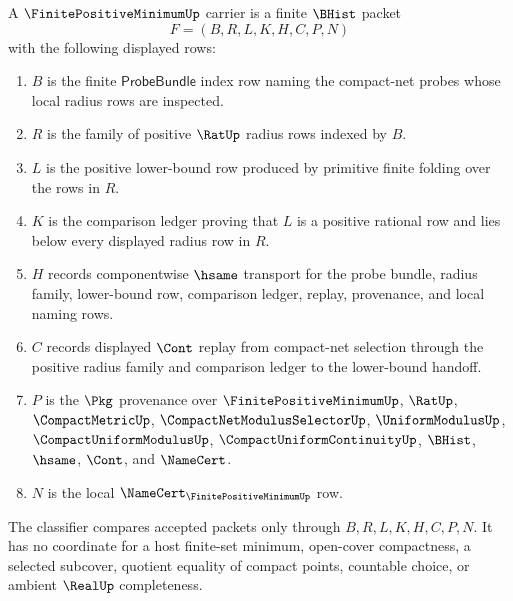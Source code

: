 \begin{definition}
\label{def:finite-positive-minimum-carrier}
A $\FinitePositiveMinimumUp$ carrier is a finite $\BHist$ packet
$$
F=(B,R,L,K,H,C,P,N)
$$
with the following displayed rows:
\begin{enumerate}
\item $B$ is the finite $\mathsf{ProbeBundle}$ index row naming the compact-net probes whose local radius rows are inspected.
\item $R$ is the family of positive $\RatUp$ radius rows indexed by $B$.
\item $L$ is the positive lower-bound row produced by primitive finite folding over the rows in $R$.
\item $K$ is the comparison ledger proving that $L$ is a positive rational row and lies below every displayed radius row in $R$.
\item $H$ records componentwise $\hsame$ transport for the probe bundle, radius family, lower-bound row, comparison ledger, replay, provenance, and local naming rows.
\item $C$ records displayed $\Cont$ replay from compact-net selection through the positive radius family and comparison ledger to the lower-bound handoff.
\item $P$ is the $\Pkg$ provenance over $\FinitePositiveMinimumUp$, $\RatUp$, $\CompactMetricUp$, $\CompactNetModulusSelectorUp$, $\UniformModulusUp$, $\CompactUniformModulusUp$, $\CompactUniformContinuityUp$, $\BHist$, $\hsame$, $\Cont$, and $\NameCert$.
\item $N$ is the local $\NameCert_{\FinitePositiveMinimumUp}$ row.
\end{enumerate}
The classifier compares accepted packets only through $B,R,L,K,H,C,P,N$. It has no coordinate for a host finite-set minimum, open-cover compactness, a selected subcover, quotient equality of compact points, countable choice, or ambient $\RealUp$ completeness.
\end{definition}

